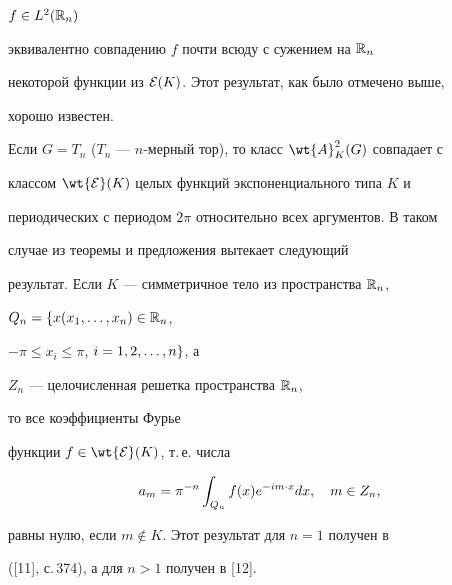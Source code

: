 $f\in L^2(\Bbb R_n)$


эквивалентно совпадению $f$ почти всюду с сужением на $\Bbb R_n$ 


некоторой функции из ${\cal E}(K)$. Этот результат, как было отмечено выше,


хорошо известен.





Если $G=T_n$ ($T_n$ --- $n$-мерный тор), то класс $\wt{A}_K^2(G)$ совпадает с 


классом $\wt{\cal E}(K)$ целых функций экспоненциального типа $K$ и 


периодических с периодом $2\pi$ относительно всех аргументов. В таком 


случае из теоремы и предложения вытекает следующий 


результат. Если $K$ --- симметричное тело из пространства $\Bbb R_n$,


$Q_n=\{x(x_1,\dotsc,x_n)\in \Bbb R_n$,


$-\pi\le x_i\le \pi$, $i=1,2,\dotsc,n\}$, а 


$Z_n$ --- целочисленная решетка пространства $\Bbb R_n$,


то все коэффициенты Фурье 


функции $f\in\wt{\cal E}(K)$, т.\,е. числа


$$


a_m=\pi^{-n}\int_{Q_n}f(x)e^{-im\cd x}dx,\quad m\in Z_n,\notag


$$


равны нулю, если $m\notin K$. Этот результат для $n=1$ получен в


([11], с.\,374), а для $n>1$ получен в [12].





